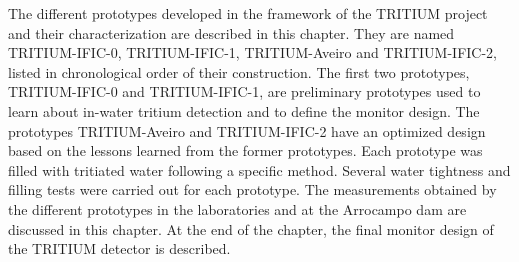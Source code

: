 The different prototypes developed in the framework of the TRITIUM project and their characterization are described in this chapter. They are named TRITIUM-IFIC-0, TRITIUM-IFIC-1, TRITIUM-Aveiro and TRITIUM-IFIC-2, listed in chronological order of their construction. The first two prototypes, TRITIUM-IFIC-0 and TRITIUM-IFIC-1, are preliminary prototypes used to learn about in-water tritium detection and to define the monitor design. The prototypes TRITIUM-Aveiro and TRITIUM-IFIC-2 have an optimized design based on the lessons learned from the former prototypes. Each prototype was filled with tritiated water following a specific method. Several water tightness and filling tests were carried out for each prototype. The measurements obtained by the different prototypes in the laboratories and at the Arrocampo dam are discussed in this chapter. At the end of the chapter, the final monitor design of the TRITIUM detector is described.